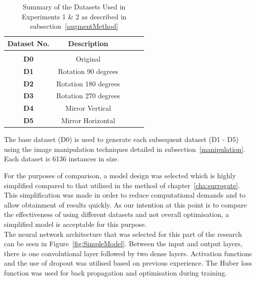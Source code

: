 \begin{table}[h!]
	 \begin{center}
		
		\begin{tabular}{c|c|c|r|c} %
			\textbf{Dataset No.} & \textbf{Description}  \\
			
			\hline
			& \\
			\textbf{D0} &  Original \\
			\textbf{D1}   & Rotation 90 degrees \\ 
			\textbf{D2}  & Rotation 180 degrees  \\
			\textbf{D3} &  Rotation 270 degrees  \\
			\textbf{D4} &  Mirror Vertical  \\
			\textbf{D5} &  Mirror Horizontal
			\\ 
			
		\end{tabular}
		\caption{Summary of the Datasets Used in Experiments 1 \& 2 as described in subsection~\ref{augmentMethod}} {The base dataset (D0) is used to generate each subsequent dataset (D1 - D5) using the image manipulation techniques detailed in subsection~\ref{manipulation}. Each dataset is 6136 instances in size. }
		\label{tab:Augdatasets}
		 \end{center}
\end{table}

\noindent
For the purposes of comparison, a model design was selected which is highly simplified compared to that utilised in the method of chapter~\ref{cha:surrogate}. This simplification was made in order to reduce computational demands and to allow obtainment of results quickly. As our intention at this point is to compare the effectiveness of using different datasets and not overall optimisation, a simplified model is acceptable for this purpose. 
\\

\noindent
The neural network architecture that was selected for this part of the research can be seen in Figure~\ref{fig:SimpleModel}. Between the input and output layers, there is one convolutional layer followed by two dense layers. Activation functions and the use of dropout was utilised based on previous experience. The Huber loss function was used for back propagation and optimisation during training.
\\


